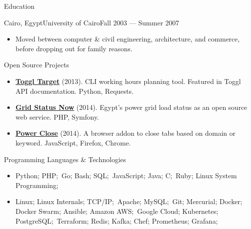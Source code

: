 \documentclass[]{mosabcv}
\begin{document}
\begin{cvsection}{Education}
  \begin{cvsubsection}{Cairo, Egypt}{University of Cairo}{Fall 2003 --- Summer 2007}
    \begin{itemize}
      \item Moved between computer \& civil engineering, architecture,
        and commerce, before dropping out for family reasons.
    \end{itemize}
  \end{cvsubsection}
\end{cvsection}

\begin{cvsection}{Open Source Projects}
  \begin{cvsubsection}{}{}{}
    \begin{itemize}
      \item \textbf{\href{https://github.com/mos3abof/toggl_target}{Toggl
        Target}} (2013). CLI working hours planning tool. Featured in Toggl API
        documentation. Python, Requests.
      \item \textbf{\href{https://www.gridstatusnow.com}{Grid Status Now}}
        (2014). Egypt's power grid load status as an open source web service.
        PHP, Symfony.
      \item \textbf{\href{https://power-close.com/}{Power Close}} (2014). A
        browser addon to close tabs based on domain or keyword. JavaScript,
        Firefox, Chrome.
    \end{itemize}
  \end{cvsubsection}
\end{cvsection}

\begin{cvsection}{Programming Languages \& Technologies}
  \begin{cvsubsection}{}{}{}
    \begin{itemize}
      \item Python; PHP;\ Go; Bash; SQL;\ JavaScript; Java; C;\  Ruby;
        Linux System Programming;
      \item Linux; Linux Internals; TCP/IP;\ Apache; MySQL;\ Git; Mercurial;
        Docker; Docker Swarm; Ansible; Amazon AWS;\ Google Cloud; Kubernetes;
        PostgreSQL;\ Terraform; Redis; Kafka; Chef; Prometheus; Grafana;
    \end{itemize}
  \end{cvsubsection}
\end{cvsection}
\end{document}
